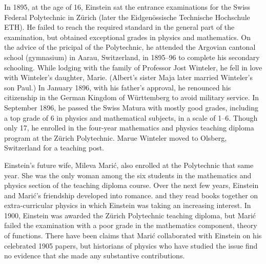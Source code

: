 \documentclass{article}
\begin{document}
In 1895, at the age of 16, Einstein sat the entrance examinations for the
Swiss Federal Polytechnic in Z\"{u}rich (later the Eidgen\"{o}ssische
Technische Hochschule ETH). He failed to reach the required standard in
the general part of the examination, but obtained exceptional grades
in physics and mathematics. On the advice of the pricipal of the 
Polytechnic, he attended the Argovian cantonal school (gymnasium) in
Aarau, Switzerland, in 1895--96 to complete his secondary schooling.
While lodging with the family of Professor Jost Winteler, he fell in
love with Winteler's daughter, Marie. (Albert's sister Maja later
married Winteler's son Paul.) In January 1896, with his father's approval,
he renounced his citizenship in the German Kingdom of W\"{u}rttemberg
to avoid military service. In September 1896, he passed the Swiss Matura
with mostly good grades, including a top grade of 6 in physics and 
mathematical subjects, in a scale of 1--6. Though only 17, he enrolled
in the four-year mathematics and physics teaching diploma program at
the Z\"{u}rich Polytechnic. Marue Winteler moved to Olsberg, Switzerland
for a teaching post.

Einstein's future wife, Mileva Mari\'{c}, also enrolled at the Polytechnic
that same year. She was the only woman among the six students in the
mathematics and physics section of the teaching diploma course. Over
the next few years, Einstein and Mari\'{c}'s friendship developed into
romance. and they read books together on extra-curricular physics in
which Einstein was taking an increasing interest. In 1900, Einstein was
awarded the Z\"{u}rich Polytechnic teaching diploma, but Mari\'{c} failed
the examination with a poor grade in the mathematics component, theory of
functions. There have been claims that Mari\'{c} collaborated with Einstein
on his celebrated 1905 papers, but historians of physics who have studied
the issue find no evidence that she made any substantive contributions.
\end{document}
